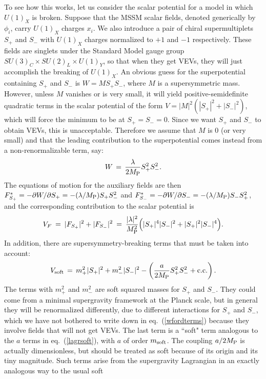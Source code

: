 \documentclass[12pt]{article}
\def\beq{\begin{eqnarray}}
\def\eeq{\end{eqnarray}}
\def\conj{{{\rm c.c.}}}
\def\MPlanck{M_{\rm P}}
\def\Splus{S_+}
\def\Sminus{S_-}
\begin{document}
To see how this works, let us consider the scalar potential for a model in
which $U(1)_X$ is broken. Suppose that the MSSM scalar fields, denoted
generically by $\phi_i$, carry $U(1)_X$ charges $x_i$. We also introduce a
pair of chiral supermultiplets $\Splus$ and $\Sminus$ with $U(1)_X$
charges normalized to $+1$ and $-1$ respectively. These fields are
singlets under the Standard Model gauge group $SU(3)_C \times SU(2)_L
\times U(1)_Y$, so that when they get VEVs, they will just accomplish the
breaking of $U(1)_X$. An obvious guess for the superpotential containing
$\Splus$ and $\Sminus$ is $W = M \Splus \Sminus$, where $M$ is a
supersymmetric mass. However, unless $M$ vanishes or is very small, it
will yield positive-semidefinite quadratic terms in the scalar potential
of the form $V = |M|^2 (|\Splus|^2 + |\Sminus|^2)$, which will force the
minimum to be at $\Splus = \Sminus = 0$. Since we want $\Splus$ and
$\Sminus$ to obtain VEVs, this is unacceptable. Therefore we assume that
$M$ is 0 (or very small) and that the leading contribution to the
superpotential comes instead from a non-renormalizable term, say: 
\beq
W \,=\, {\lambda\over 2 \MPlanck} \Splus^2 \Sminus^2.
\label{wfordterms}
\eeq
The equations 
of motion for the auxiliary fields are then $F^*_{\Splus} = -\partial 
W/\partial \Splus = -(\lambda/\MPlanck)\Splus \Sminus^{2}$ and 
$F^*_{\Sminus} = -\partial W/\partial \Sminus = -(\lambda/\MPlanck)\Sminus 
\Splus^{2}$, and the corresponding contribution to the scalar potential is
\beq
V_F \>=\> |F_{\Splus}|^2 + |F_{\Sminus}|^2  \>=\>
{|\lambda|^2\over \MPlanck^2}
\Bigl ( |\Splus|^4 |\Sminus|^2 + |\Splus|^2 |\Sminus|^4 \Bigr )  .
\eeq
In addition, there are supersymmetry-breaking terms that must be taken 
into account:
\beq
V_{\rm soft} \,=\, m_+^2 |\Splus|^2 + m_-^2 |\Sminus|^2 -
\left ({a\over 2\MPlanck} \Splus^2 \Sminus^2 + \conj\right ).
\eeq
The terms with $m_+^2$ and $m_-^2$ are soft squared masses for
$\Splus$ and $\Sminus$. They could come from a minimal supergravity
framework at the Planck scale, but in general they will be renormalized
differently, due to different interactions for $\Splus$ and $\Sminus$,
which we have not bothered to write down in eq.~(\ref{wfordterms}) because
they involve fields that will not get VEVs. The last term is a ``soft" 
term analogous to the $a$ terms in 
eq.~(\ref{lagrsoft}), with $a$ of order $m_{\rm soft}$. The coupling
$a/2\MPlanck$ is actually dimensionless, but should be treated as soft
because of its origin and its tiny magnitude. Such terms arise from the
supergravity Lagrangian in an exactly analogous way to the usual soft
\end{document}
